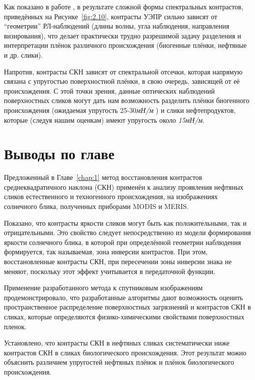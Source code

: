 Как показано в работе \citep{2008}, в результате сложной формы спектральных контрастов, приведённых на Рисунке~\ref{fig:2.10}, контрасты УЭПР сильно зависят от ``геометрии'' РЛ-наблюдений (длины волны, угла наблюдения, направления визирования), что делает практически трудно разрешимой задачу разделения и интерпретации плёнок различного происхождения (биогенные плёнки, нефтяные и др. слики).

Напротив, контрасты СКН зависят от спектральной отсечки, которая напрямую связана с упругостью поверхностной плёнки, в свою очередь, зависящей от её происхождения. С этой точки зрения, данные оптических наблюдений поверхностных сликов могут дать нам возможность разделить плёнки биогенного происхождения (ожидаемая упругость 25-30\textit{мН/м }) и слики нефтепродуктов, которые (следуя нашим оценкам) имеют упругость около \textit{15мН/м}.



\newpage



\section{Выводы по главе}


Предложенный в Главе~\ref{chap:1} метод восстановления контрастов среднеквадратичного наклона (СКН) применён к анализу проявления нефтяных сликов естественного и техногенного происхождения, на изображениях солнечного блика, полученных приборами MODIS и MERIS.

Показано, что контрасты яркости сликов могут быть как положительными, так и отрицательными. Это свойство следует непосредственно из модели формирования яркости солнечного блика, в которой при определённой геометрии наблюдения формируется, так называемая, зона инверсии контрастов. При этом, восстановленные контрасты СКН, при пересечении зоны инверсии знака не меняют, поскольку этот эффект учитывается в передаточной функции.

Применение разработанного метода к спутниковым изображениям продемонстрировало, что разработанные алгоритмы дают возможность оценить пространственное распределение поверхностных загрязнений и контрастов СКН в сликах, которые определяются физико-химическими свойствами поверхностных пленок.

Установлено, что контрасты СКН в нефтяных сликах систематически ниже контрастов СКН в сликах биологического происхождения. Этот результат можно объяснить различием упругостей нефтяных плёнок и плёнок биологического происхождения.

